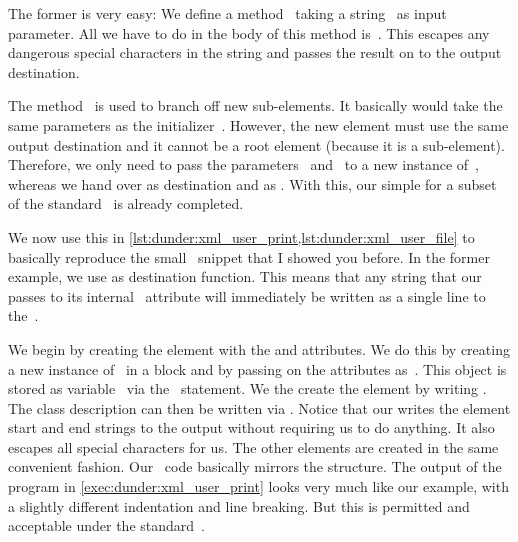 The former is very easy:
We define a method~ taking a string~ as input parameter.
All we have to do in the body of this method is~.
This escapes any dangerous  special characters in the string and passes the result on to the output destination.

The method~ is used to branch off new sub-elements.
It basically would take the same parameters as the initializer~.
However, the new element must use the same output destination and it cannot be a root element (because it is a sub-element).
Therefore, we only need to pass the parameters~ and~ to a new instance of~, whereas we hand over  as destination and  as .
With this, our simple  for a subset of the  standard~\cite{BPSMM2008EMLX1FE} is already completed.%
%
%
%
%
%
%

We now use this  in \cref{lst:dunder:xml_user_print,lst:dunder:xml_user_file} to basically reproduce the small ~snippet that I showed you before.
In the former example, we use  as destination function.
This means that any string that our  passes to its internal ~attribute will immediately be written as a single line to the~.

We begin by creating the  element with the  and  attributes.
We do this by creating a new instance of~ in a  block and by passing on the attributes as~.
This object is stored as variable~ via the ~statement.
We the create the  element by writing .
The class description can then be written via .
Notice that our  writes the element start and end strings to the output without requiring us to do anything.
It also escapes all special characters for us.
The other elements are created in the same convenient fashion.
Our \python\ code basically mirrors the  structure.
The output of the program in \cref{exec:dunder:xml_user_print} looks very much like our example, with a slightly different indentation and line breaking.
But this is permitted and acceptable under the  standard~\cite{BPSMM2008EMLX1FE}.

